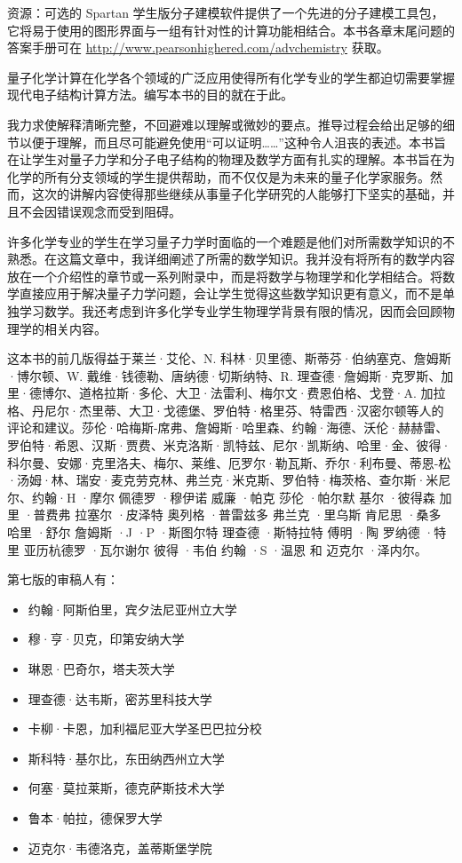 \documentclass[12pt,a4paper,openany]{ctexbook}
\begin{document}
\begin{flushleft}
\medskip %
资源：可选的 Spartan 学生版分子建模软件提供了一个先进的分子建模工具包，它将易于使用的图形界面与一组有针对性的计算功能相结合。本书各章末尾问题的答案手册可在 \url{http://www.pearsonhighered.com/advchemistry} 获取。
\end{flushleft}
\newpage
\begin{flushleft}
    \setlength{\parindent}{2em}
量子化学计算在化学各个领域的广泛应用使得所有化学专业的学生都迫切需要掌握现代电子结构计算方法。编写本书的目的就在于此。

我力求使解释清晰完整，不回避难以理解或微妙的要点。推导过程会给出足够的细节以便于理解，而且尽可能避免使用“可以证明……”这种令人沮丧的表述。本书旨在让学生对量子力学和分子电子结构的物理及数学方面有扎实的理解。本书旨在为化学的所有分支领域的学生提供帮助，而不仅仅是为未来的量子化学家服务。然而，这次的讲解内容使得那些继续从事量子化学研究的人能够打下坚实的基础，并且不会因错误观念而受到阻碍。

许多化学专业的学生在学习量子力学时面临的一个难题是他们对所需数学知识的不熟悉。在这篇文章中，我详细阐述了所需的数学知识。我并没有将所有的数学内容放在一个介绍性的章节或一系列附录中，而是将数学与物理学和化学相结合。将数学直接应用于解决量子力学问题，会让学生觉得这些数学知识更有意义，而不是单独学习数学。我还考虑到许多化学专业学生物理学背景有限的情况，因而会回顾物理学的相关内容。

这本书的前几版得益于莱兰·艾伦、N. 科林·贝里德、斯蒂芬·伯纳塞克、詹姆斯·博尔顿、W. 戴维·钱德勒、唐纳德·切斯纳特、R. 理查德·詹姆斯·克罗斯、加里·德博尔、道格拉斯·多伦、大卫·法雷利、梅尔文·费恩伯格、戈登·A. 加拉格、丹尼尔·杰里蒂、大卫·戈德堡、罗伯特·格里芬、特雷西·汉密尔顿等人的评论和建议。莎伦·哈梅斯-席弗、詹姆斯·哈里森、约翰·海德、沃伦·赫赫雷、罗伯特·希恩、汉斯·贾费、米克洛斯·凯特兹、尼尔·凯斯纳、哈里·金、彼得·科尔曼、安娜·克里洛夫、梅尔、莱维、厄罗尔·勒瓦斯、乔尔·利布曼、蒂恩-松·汤姆·林、瑞安·麦克劳克林、弗兰克·米克斯、罗伯特·梅茨格、查尔斯·米尼尔、约翰·H ·摩尔 佩德罗 ·穆伊诺 威廉 ·帕克 莎伦 ·帕尔默 基尔 ·彼得森 加里 ·普费弗 拉塞尔 ·皮泽特 奥列格 ·普雷兹多 弗兰克 ·里乌斯 肯尼思 ·桑多 哈里 ·舒尔 詹姆斯 ·J ·P ·斯图尔特 理查德 ·斯特拉特 傅明 ·陶 罗纳德 ·特里 亚历杭德罗 ·瓦尔谢尔 彼得 ·韦伯 约翰 ·S ·温恩 和 迈克尔 ·泽内尔。

第七版的审稿人有：
\begin{itemize}
\item 约翰·阿斯伯里，宾夕法尼亚州立大学
\item 穆·亨·贝克，印第安纳大学
\item 琳恩·巴奇尔，塔夫茨大学
\item 理查德·达韦斯，密苏里科技大学
\item 卡柳·卡恩，加利福尼亚大学圣巴巴拉分校
\item 斯科特·基尔比，东田纳西州立大学
\item 何塞·莫拉莱斯，德克萨斯技术大学
\item 鲁本·帕拉，德保罗大学
\item 迈克尔·韦德洛克，盖蒂斯堡学院
\end{itemize}


\end{flushleft}
\end{document}
